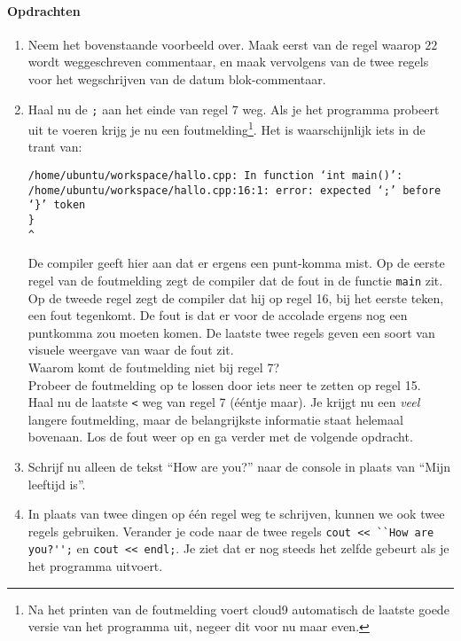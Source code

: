 \documentclass[12pt,a4paper]{article}
\newcommand{\icode}{\lstinline}
\begin{document}
\paragraph{Opdrachten}
\begin{enumerate}
		\item
			Neem het bovenstaande voorbeeld over. Maak eerst van de regel waarop $22$ wordt weggeschreven commentaar, en maak vervolgens van de twee regels voor het wegschrijven van de datum blok-commentaar.
		\item
			Haal nu de \texttt{;} aan het einde van regel 7 weg. Als je het programma probeert uit te voeren krijg je nu een foutmelding\footnote{Na het printen van de foutmelding voert cloud9 automatisch de laatste goede versie van het programma uit, negeer dit voor nu maar even.}. Het is waarschijnlijk iets in de trant van:
			\begin{verbatim}
/home/ubuntu/workspace/hallo.cpp: In function ‘int main()’:                                                                                                      
/home/ubuntu/workspace/hallo.cpp:16:1: error: expected ‘;’ before ‘}’ token                                                                                      
}                                                                                                                                                               
^
			\end{verbatim}
			De compiler geeft hier aan dat er ergens een punt-komma mist. Op de eerste regel van de foutmelding zegt de compiler dat de fout in de functie \texttt{main} zit. Op de tweede regel zegt de compiler dat hij op regel 16, bij het eerste teken, een fout tegenkomt. De fout is dat er voor de accolade ergens nog een puntkomma zou moeten komen. De laatste twee regels geven een soort van visuele weergave van waar de fout zit. \\
			Waarom komt de foutmelding niet bij regel 7? \\
			Probeer de foutmelding op te lossen door iets neer te zetten op regel 15. \\
			Haal nu de laatste \texttt{<} weg van regel 7 (ééntje maar). Je krijgt nu een \emph{veel} langere foutmelding, maar de belangrijkste informatie staat helemaal bovenaan. Los de fout weer op en ga verder met de volgende opdracht.
		\item
			Schrijf nu alleen de tekst ``How are you?'' naar de console in plaats van ``Mijn leeftijd is''.
		\item
			In plaats van twee dingen op \'e\'en regel weg te schrijven, kunnen we ook twee regels gebruiken. Verander je code naar de twee regels \icode{cout << ``How are you?'';} en \icode{cout << endl;}. Je ziet dat er nog steeds het zelfde gebeurt als je het programma uitvoert.

\end{enumerate}
\end{document}
